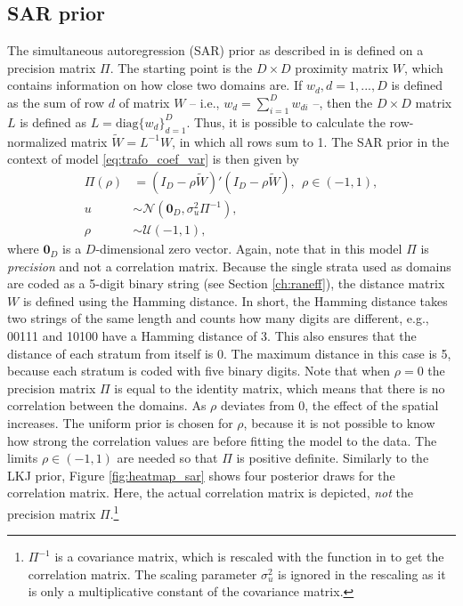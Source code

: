 \subsection{SAR prior}
The simultaneous autoregression (SAR) prior as described in \cite{chung_bayesian_2020} is defined on a precision matrix $\Pi$.
The starting point is the $D\times D$ proximity matrix $W$, which contains information on how close two domains are.
If $w_d, d = 1, ..., D$ is defined as the sum of row $d$ of matrix $W$ – i.e., $w_d = \displaystyle \sum_{i = 1}^D w_{di}$ –, then the $D \times D$ matrix $L$ is defined as $L = \text{diag}\{w_d\}_{d=1}^D$.
Thus, it is possible to calculate the row-normalized matrix $\widetilde W = L^{-1}W$, in which all rows sum to 1.
The SAR prior in the context of model \ref{eq:trafo_coef_var} is then given by
\begin{equation*}
    \begin{split}
        \Pi(\rho) &= (I_D - \rho \widetilde W)'(I_D - \rho \widetilde W), ~~ \rho \in (-1, 1),\\
        u &\sim \mathcal N(\boldsymbol{0}_D, \sigma_u^2 \Pi^{-1}),\\
        \rho &\sim \mathcal U(-1, 1),
    \end{split}
\end{equation*}
where $\boldsymbol{0}_D$ is a $D$-dimensional zero vector.
Again, note that in this model $\Pi$ is \textit{precision} and not a correlation matrix.
Because the single strata used as domains are coded as a 5-digit binary string (see Section \ref{ch:raneff}), the distance matrix $W$ is defined using the Hamming distance.
In short, the Hamming distance takes two strings of the same length and counts how many digits are different, e.g., 00111 and 10100 have a Hamming distance of 3.
This also ensures that the distance of each stratum from itself is 0.
The maximum distance in this case is 5, because each stratum is coded with five binary digits.
Note that when $\rho = 0$ the precision matrix $\Pi$ is equal to the identity matrix, which means that there is no correlation between the domains.
As $\rho$ deviates from 0, the effect of the spatial increases.
The uniform prior is chosen for $\rho$, because it is not possible to know how strong the correlation values are before fitting the model to the data.
The limits $\rho \in (-1, 1)$ are needed so that $\Pi$ is positive definite.
Similarly to the LKJ prior, Figure \ref{fig:heatmap_sar} shows four posterior draws for the correlation matrix.
Here, the actual correlation matrix is depicted, \textit{not} the precision matrix $\Pi$.\footnote{$\Pi^{-1}$ is a covariance matrix, which is rescaled with the  function in  to get the correlation matrix. The scaling parameter $\sigma^2_u$ is ignored in the rescaling as it is only a multiplicative constant of the covariance matrix.}
